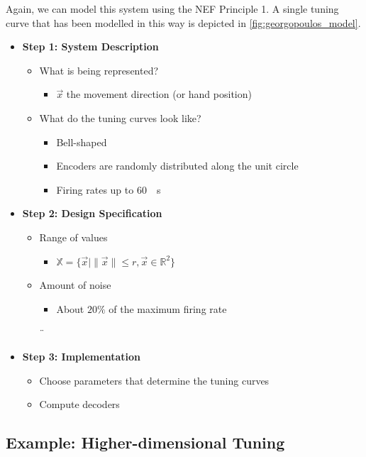 \documentclass[10pt,letterpaper,oneside]{article}
\begin{document}
Again, we can model this system using the NEF Principle 1. A single tuning curve that has been modelled in this way is depicted in \cref{fig:georgopoulos_model}.
\begin{multicols}{2}
	\begin{itemize}
		\item \textbf{Step 1: System Description}
		\begin{itemize}
			\item What is being represented?
			\begin{itemize}
				\item $\vec x$ the movement direction (or hand position)
			\end{itemize}
			\item What do the tuning curves look like?
			\begin{itemize}
				\item Bell-shaped
				\item Encoders are randomly distributed along the unit circle
				\item Firing rates up to \SI{60}{\per\second}
			\end{itemize}
		\end{itemize}
		\columnbreak
		\item \textbf{Step 2: Design Specification}
		\begin{itemize}
			\item Range of values
			\begin{itemize}
				\item $\mathbb{X} = \{\vec x \mid \|\vec x\| \leq r, \vec x \in \mathbb{R}^2 \}$
			\end{itemize}
			\item Amount of noise
			\begin{itemize}
				\item About $20\%$ of the maximum firing rate
			\end{itemize}¨
		\end{itemize}
		\item \textbf{Step 3: Implementation}
		\begin{itemize}
			\item Choose parameters that determine the tuning curves
			\item Compute decoders
		\end{itemize}
	\end{itemize}
\end{multicols}

\subsection{Example: Higher-dimensional Tuning}
\end{document}
